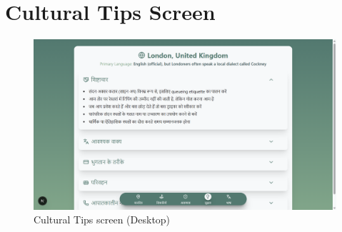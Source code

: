 \section{Cultural Tips Screen}
\begin{figure}[H]
    \centering
    \includegraphics[height=0.3\textheight,keepaspectratio]{images/Screenshots/5_culturaltips_desktop.png}
    \caption{Cultural Tips screen (Desktop)}
\end{figure}

